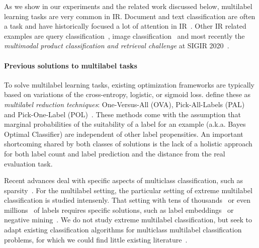 As we show in our experiments and the related work discussed below, multilabel learning tasks are very common in \ac{IR}. Document and text classification are often a  task and have historically focused a lot of attention in \ac{IR}~\cite{IRClassStat, textCategorization, statTextCategorization, documentClassification}. Other \ac{IR} related examples are query classification~\cite{queryClassification, introIR}, image classification~\cite{imageClassification, faceDetection} and most recently the \textit{multimodal product classification and retrieval challenge} at SIGIR 2020~\cite{Amoualian2020SIGIR2E}. 
\fi

\paragraph{Previous solutions to multilabel tasks}
To solve multilabel learning tasks, existing optimization frameworks are typically based on variations of the cross-entropy, logistic, or sigmoid loss. \citeauthor{multilabelReduction} define these as \emph{multilabel reduction techniques}: One-Versus-All (OVA), Pick-All-Labels (PAL) and Pick-One-Label (POL)~\cite{multilabelReduction}. These methods come with the assumption that marginal probabilities of the suitability of a label for an example (a.k.a. Bayes Optimal Classifier) are independent of other label propensities. 
An important shortcoming shared by both classes of solutions is the lack of a holistic approach for both label count and label prediction and the distance from the real evaluation task.

Recent advances  deal with specific aspects of multiclass classification, such as sparsity~\citep{focalLoss,tencent}. For the multilabel setting, the particular setting of extreme multilabel classification is studied intensenly. That setting with tens of thousands~\cite{extremeClassification} or even millions~\cite{millionsOfLabels, extremeMilliionsSlice} of labels requires specific solutions, such as label embeddings~\cite{extremeMultilabelEmbeddings} or negative mining~\cite{stochasticNegativeMining}. We do not study extreme multilabel classification, but seek to adapt existing classification algorithms for multiclass multilabel classification problems, for which we could find little existing literature~\citep{multilabelMethods}.


